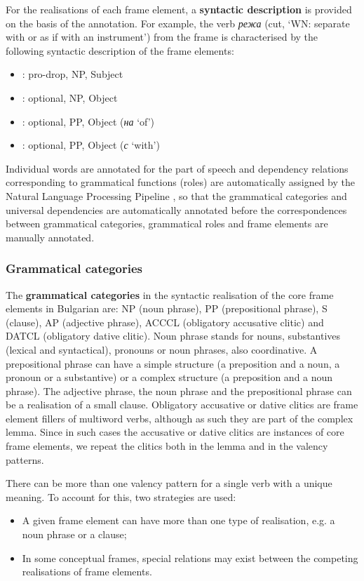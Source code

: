\documentclass[output=paper,colorlinks,citecolor=brown]{langscibook}
\begin{document}
For the realisations of each frame element, a \textbf{syntactic description} is provided on the basis of the annotation. For example, the verb \textit{режа} (cut, `WN: separate with or as if with an instrument') from the frame  is characterised by the following syntactic description of the frame elements:
\begin{itemize}
    \item {}: pro-drop, NP, Subject
    \item {}: optional, NP, Object
    \item {}:  optional, PP, Object (\textit{на} `of')
    \item {}: optional, PP, Object (\textit{с} `with')
\end{itemize}

Individual words are annotated for the part of speech and dependency relations corresponding to grammatical functions (roles) are automatically assigned by the Natural Language Processing Pipeline \citep{koeva-etal-2020-natural}, so that the grammatical categories and universal dependencies are automatically annotated before the correspondences between grammatical categories, grammatical roles and frame elements are manually annotated.

\subsubsection{Grammatical categories}

The \textbf{grammatical categories} in the syntactic realisation of the core frame elements in Bulgarian are: NP (noun phrase), PP (prepositional phrase), S (clause), AP (adjective phrase), ACCCL (obligatory accusative clitic) and DATCL (obligatory dative clitic). Noun phrase stands for nouns, substantives (lexical and syntactical), pronouns or noun phrases, also coordinative. A prepositional phrase can have a simple structure (a preposition and a noun, a pronoun or a substantive) or a complex structure (a preposition and a noun phrase). The adjective phrase, the noun phrase and the prepositional phrase can be a realisation of a small clause. Obligatory accusative or dative clitics are frame element fillers of multiword verbs, although as such they are part of the complex lemma. Since in such cases the accusative or dative clitics are instances of core frame elements, we repeat the clitics both in the lemma and in the valency patterns.

There can be more than one valency pattern for a single verb with a unique meaning. To account for this, two strategies are used:
\begin{itemize}
 \item A given frame element can have more than one type of realisation, e.g. a noun phrase or a clause;
 \item In some conceptual frames, special relations may exist between the competing realisations of frame elements.
\end{itemize}
\end{document}

